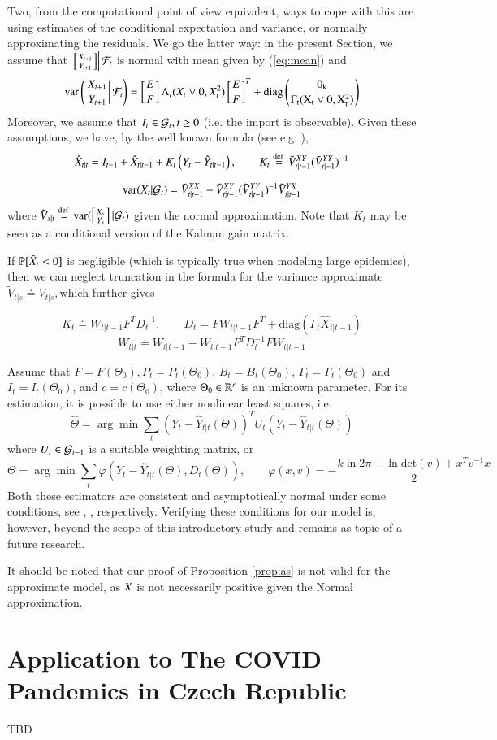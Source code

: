 \documentclass[english]{elsarticle}
\theoremstyle{plain}
\theoremstyle{remark}
\theoremstyle{plain}
\theoremstyle{definition}
\begin{document}
Two, from the computational point of view equivalent, ways to cope
with this are using estimates of the conditional expectation and variance,
or normally approximating the residuals. We go the latter way: in
the present Section, we assume that $\left.\left[{X_{t+1}\atop Y_{t+1}}\right]\right|\F_{t}$
is normal with mean given by (\ref{eq:mean}) and 
\[
\var\left(\left.{X_{t+1}\atop Y_{t+1}}\right|\F_{t}\right)=\left[{E\atop F}\right]\Lambda_{t}(X_{t}\vee0,X_{t}^{2})\left[{E\atop F}\right]^{T}+\mathrm{diag\left({0_{k}\atop \Gamma_{t}(X_{t}\vee0,X_{t}^{2})}\right)}
\]
Moreover, we assume that $I_{t}\in\G_{t},t\geq0$ (i.e. the import
is observable). Given these assumptions, we have, by the well known
formula (see e.g. \cite{Eaton07}), 
\begin{multline*}
\hat{X}_{t|t}=I_{t-1}+\hat{X}_{t|t-1}+K_{t}\left(Y_{t}-\hat{Y}_{t|t-1}\right),\qquad K_{t}\defined\tilde{V}_{t|t-1}^{XY}(\tilde{V}_{t|-1}^{YY})^{-1}
\end{multline*}

\begin{multline*}
\var(X_{t}|\G_{t})=\tilde{V}_{t|t-1}^{XX}-\tilde{V}_{t|t-1}^{XY}(\tilde{V}_{t|t-1}^{YY})^{-1}\tilde{V}_{t|t-1}^{YX}
\end{multline*}
where $\tilde{V}_{s|t}\defined\var(\left[{X_{s}\atop Y_{s}}\right]|\G_{t})$
given the normal approximation. Note that $K_{t}$ may be seen as
a conditional version of the Kalman gain matrix. 

If $\P[\hat{X}_{t}<0]$ is negligible (which is typically true when
modeling large epidemics), then we can neglect truncation in the formula
for the variance approximate $\tilde{V}_{t|s}\doteq V_{t|s},$which
further gives 

$$
K_{t}\doteq W_{t|t-1}F^{T}D_{t}^{-1},\qquad D_{t}=FW_{t|t-1}F^{T}+\mathrm{diag}(\Gamma_{t}\hat{X}_{t|t-1})
$$
$$
W_{t|t}\doteq W_{t|t-1}-W_{t|t-1}F^{T}D_{t}^{-1}FW_{t|t-1}
$$

Assume that $F=F(\Theta_{0}),$$P_{t}=P_{t}(\Theta_{0})$, $B_{t}=B_{t}(\Theta_{0})$,
$\Gamma_{t}=\Gamma_{t}(\Theta_{0})$ and $I_{t}=I_{t}(\Theta_{0})$,
and $c=c(\Theta_{0})$, where $\Theta_{0}\in\R^{r}$ is an unknown
parameter. For its estimation, it is possible to use either nonlinear
least squares, i.e. 
\[
\hat{\Theta}=\arg\min\sum_{t}(Y_{t}-\hat{Y}_{t|t}(\Theta))^{T}U_{t}(Y_{t}-\hat{Y}_{t|t}(\Theta))
\]
where $U_{t}\in\G_{t-1}$ is a suitable weighting matrix, or 
\[
\tilde{\Theta}=\arg\min\sum_{t}\varphi(Y_{t}-\hat{Y}_{t|t}(\Theta),D_{t}(\Theta)),\qquad\varphi(x,v)=-\frac{k\ln2\pi+\ln\mathrm{det}(v)+x^{T}v^{-1}x}{2}
\]
Both these estimators are consistent and asymptotically normal under
some conditions, see \cite{Jacob10}, \cite{jacob2013generalized},
respectively. Verifying these conditions for our model is, however,
beyond the scope of this introductory study and remains as topic of
a future research. 

It should be noted that our proof of Proposition \ref{prop:as} is
not valid for the approximate model, as $\barX$ is not necessarily
positive given the Normal approximation.

\section{Application to The COVID Pandemics in Czech Republic}

TBD



\end{document}
